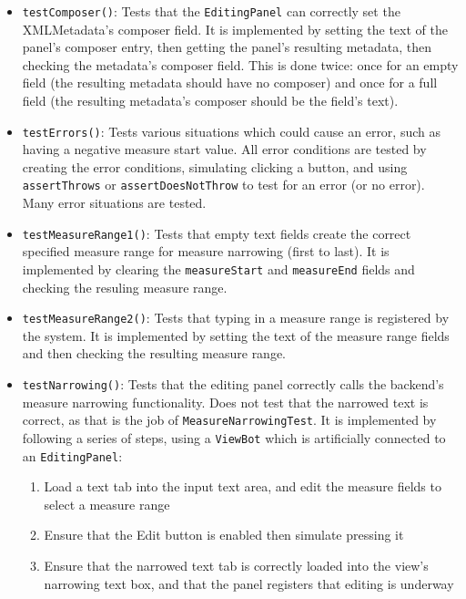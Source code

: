 \documentclass[11pt]{article}
\begin{document}
\begin{itemize}
\item \texttt{testComposer()}: Tests that the \texttt{EditingPanel} can correctly set the XMLMetadata's composer field.  It is implemented by setting the text of the panel's composer entry, then getting the panel's resulting metadata, then checking the metadata's composer field.  This is done twice: once for an empty field (the resulting metadata should have no composer) and once for a full field (the resulting metadata's composer should be the field's text).\\
\item \texttt{testErrors()}: Tests various situations which could cause an error, such as having a negative measure start value.  All error conditions are tested by creating the error conditions, simulating clicking a button, and using \texttt{assertThrows} or \texttt{assertDoesNotThrow} to test for an error (or no error).  Many error situations are tested.\\
\item \texttt{testMeasureRange1()}: Tests that empty text fields create the correct specified measure range for measure narrowing (first to last).  It is implemented by clearing the \texttt{measureStart} and \texttt{measureEnd} fields and checking the resuling measure range.\\
\item \texttt{testMeasureRange2()}: Tests that typing in a measure range is registered by the system.  It is implemented by setting the text of the measure range fields and then checking the resulting measure range.\\
\item \texttt{testNarrowing()}: Tests that the editing panel correctly calls the backend's measure narrowing functionality.  Does not test that the narrowed text is correct, as that is the job of \texttt{MeasureNarrowingTest}.  It is implemented by following a series of steps, using a \texttt{ViewBot} which is artificially connected to an \texttt{EditingPanel}:\\
\begin{enumerate}
\item Load a text tab into the input text area, and edit the measure fields to select a measure range\\
\item Ensure that the Edit button is enabled then simulate pressing it\\
\item Ensure that the narrowed text tab is correctly loaded into the view's narrowing text box, and that the panel registers that editing is underway\\

\end{enumerate}
\end{itemize}
\end{document}
